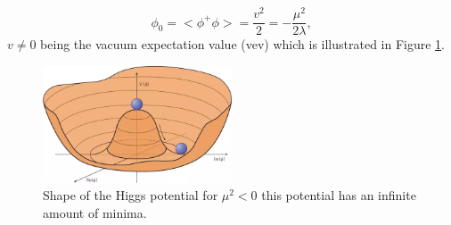 \begin{equation}
    \phi_{0}=<\phi^{+} \phi>=\frac{v^{2}}{2}=-\frac{\mu^{2}}{2 \lambda},
\end{equation}
$v\neq0$ being the vacuum expectation value (vev) which is illustrated in Figure \ref{fig:chap1:Higggs_potential}.
\begin{figure}[htbp]
    \centering
    \includegraphics[width=0.5\textwidth]{Ch1/Img/Higgs_potential.png}
    \caption{Shape of the Higgs potential for $\mu^{2} < 0$ this potential has an infinite amount of minima. \cite{HiggsPotential}}
    \label{fig:chap1:Higggs_potential}
\end{figure}

